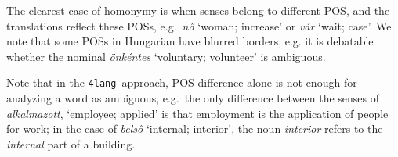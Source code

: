 \documentclass[11pt]{article}
\newcommand{\fl}{\texttt{4lang}}
\begin{document}
The clearest case of homonymy is when senses belong to different POS, and the
translations reflect these POSs, e.g.~\emph{nő} `woman; increase' or \emph{vár}
 `wait; case'.  We note that some POSs in Hungarian have
blurred borders, e.g.  it is debatable whether the nominal \emph{önkéntes}
`voluntary; volunteer' is ambiguous. 

Note that in the \fl~approach, POS-difference alone is not enough for
analyzing a word as ambiguous, e.g.~the only difference between the senses of
\emph{alkalmazott}, `employee; applied' is that employment is the application
of people for work; in the case of \emph{belső} `internal; interior', the noun
\emph{interior} refers to the \emph{internal} part of a building.



\todo{missing sense \\ édes [['sweetheart'], ['cute \\
  közvetlen [['informal'], ['casual}

\end{document}
